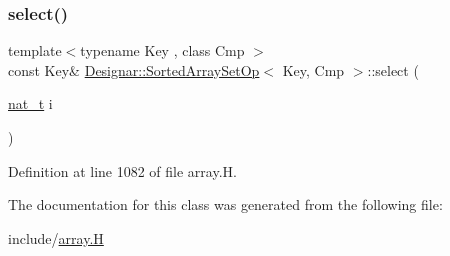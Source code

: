 \subsubsection{\texorpdfstring{select()}{select()}}
{\footnotesize\ttfamily template$<$typename Key , class Cmp $>$ \\
const Key\& \hyperlink{class_designar_1_1_sorted_array_set_op}{Designar\+::\+Sorted\+Array\+Set\+Op}$<$ Key, Cmp $>$\+::select (\begin{DoxyParamCaption}\item[{\hyperlink{namespace_designar_aa72662848b9f4815e7bf31a7cf3e33d1}{nat\+\_\+t}}]{i }\end{DoxyParamCaption})\hspace{0.3cm}{\ttfamily [inline]}}



Definition at line 1082 of file array.\+H.



The documentation for this class was generated from the following file\+:\begin{DoxyCompactItemize}
\item 
include/\hyperlink{array_8_h}{array.\+H}\end{DoxyCompactItemize}
